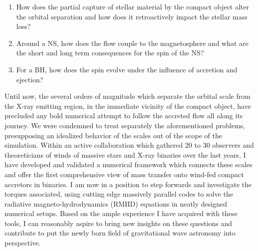 \documentclass[letterpaper,12pt,onecolumn]{article}
\makeatletter
\newcommand*{\hmxb}{HMXB\@\xspace}
\newcommand*{\ns}{NS\@\xspace}
\newcommand*{\bh}{BH\@\xspace}
\makeatother
\begin{document}

%

\begin{enumerate}
\item How does the partial capture of stellar material by the compact object alter the orbital separation and how does it retroactively impact the stellar mass loss?
\item Around a \ns, how does the flow couple to the magnetosphere and what are the short and long term consequences for the spin of the \ns? 
\item For a \bh, how does the spin evolve under the influence of accretion and ejection?
\end{enumerate}

Until now, the several orders of magnitude which separate the orbital scale from the X-ray emitting region, in the immediate vicinity of the compact object, have precluded any bold numerical attempt to follow the accreted flow all along its journey. We were condemned to treat separately the aforementioned problems, presupposing an idealized behavior of the scales out of the scope of the simulation. Within an active collaboration which gathered 20 to 30 observers and theoreticians of winds of massive stars and X-ray binaries over the last years, I have developed and validated a numerical framework which connects these scales and offer the first comprehensive view of mass transfer onto wind-fed compact accretors in binaries. I am now in a position to step forwards and investigate the torques associated, using cutting edge massively parallel codes to solve the radiative magneto-hydrodynamics (RMHD) equations in neatly designed numerical setups. Based on the ample experience I have acquired with these tools, I can reasonably aspire to bring new insights on these questions and contribute to put the newly born field of gravitational wave astronomy into perspective.
\end{document}
